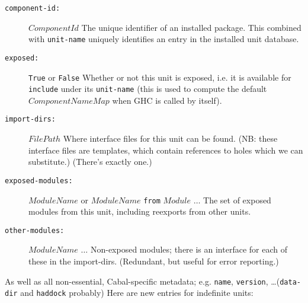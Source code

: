 \documentclass{article}
\newcommand{\I}[1]{\ensuremath{\mathit{#1}}}
\begin{document}
\begin{description}
    \item[\texttt{component-id:}] \I{ComponentId} \newline
        The unique identifier of an installed package.  This combined
        with \texttt{unit-name} uniquely identifies an entry in the
        installed unit database.
    \item[\texttt{exposed:}] \verb|True| or \verb|False| \newline
        Whether or not this unit is exposed, i.e. it is available for
        \verb|include| under its \verb|unit-name| (this is used to compute
        the default \I{ComponentNameMap} when GHC is called by itself).
    \item[\texttt{import-dirs:}] \I{FilePath} \newline
        Where interface files for this unit can be found. (NB: these
        interface files are templates, which contain references to holes
        which we can substitute.)  (There's exactly one.)
    \item[\texttt{exposed-modules:}] \I{ModuleName} or \I{ModuleName} \texttt{from} \I{Module} $\ldots$ \newline
        The set of exposed modules from this unit, including reexports from
        other units.
    \item[\texttt{other-modules:}] \I{ModuleName} $\ldots$ \newline
        Non-exposed modules; there is an interface for each of these
        in the import-dirs. (Redundant, but useful for error reporting.)
\end{description}
%
As well as all non-essential, Cabal-specific metadata; e.g. \texttt{name}, \texttt{version}, \ldots (\texttt{data-dir} and \texttt{haddock} probably)
Here are new entries for indefinite units:
\end{document}
